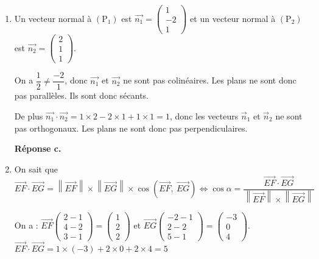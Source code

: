 \documentclass[10pt]{article}
\providecommand{\vect}[1]{\overrightarrow{#1}}
\begin{document}
\begin{enumerate}
	On a : $\vect{n}\cdot\vec{u} = 2 \times 1 - 1 \times 1 + 1 \times (-1) = 0$, donc $\vect{n}$ et $\vect{u}$ sont orthogonaux. Donc (P) et $(\Delta)$ sont parallèles.
	
	S'il existe un point commun à (P) et $(\Delta)$, alors $(\Delta)$ est incluse dans (P).
	
	$(\Delta)$ passe par le point de coordonnées $(2~;~4~;~1)$. Or $2 \times 2 - 4 + 1 - 1 = 0$, donc ce point est un point du plan (P). La droite $(\Delta)$ est donc incluse dans le plan (P).
	
	\textbf{Réponse b.}
	\item Un vecteur normal à $\left(\text{P}_1\right)$ est $\vect{n_1} = \begin{pmatrix}1\\-2\\1\end{pmatrix}$ et un vecteur normal à $\left(\text{P}_2\right)$ est $\vect{n_2} = \begin{pmatrix}2\\1\\1\end{pmatrix}$.
	
	On a $\dfrac{1}{2} \neq \dfrac{-2}{1}$, donc $\vect{n_1}$ et $\vect{n_2}$ ne sont pas colinéaires. Les plans ne sont donc pas parallèles. Ils sont donc sécants.
	
	De plus $\vect{n_1} \cdot \vect{n_2} = 1 \times 2 - 2 \times 1 + 1 \times 1 = 1$, donc les vecteurs $\vect{n}_1$ et $\vect{n}_2$ ne sont pas orthogonaux. Les plans ne sont donc pas perpendiculaires.
	
	\textbf{Réponse c.}
	\item On sait que $\vect{EF} \cdot \vect{EG} = \left\|\vect{EF}\right\| \times \left\|\vect{EG}\right\| \times \cos \left(\vect{EF},~\vect{EG}\right) \iff \cos \alpha = \dfrac{\vect{EF} \cdot \vect{EG}}{\left\|\vect{EF}\right\| \times \left\|\vect{EG}\right\|}$
	
On a : $\vect{EF}\begin{pmatrix}2-1\\4-2\\3-1\end{pmatrix} = \begin{pmatrix}1\\2\\2\end{pmatrix}$ et $\vect{EG}\begin{pmatrix}-2-1\\2-2\\5-1\end{pmatrix} = \begin{pmatrix}-3\\0\\4\end{pmatrix}$.
	$\vect{EF} \cdot \vect{EG} = 1 \times (-3) + 2 \times 0 + 2 \times 4 = 5$
	

\end{enumerate}
\end{document}
